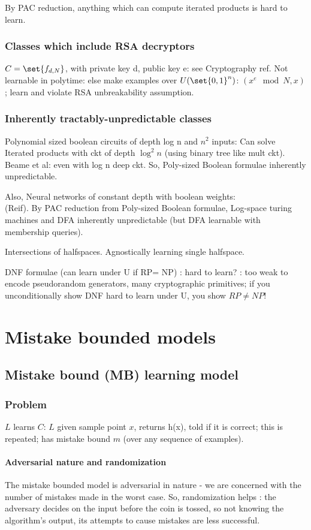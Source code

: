 \documentclass[oneside, article]{memoir}
\begin{document}
By PAC reduction, anything which can compute iterated products is hard to learn.

\subsection{Classes which include RSA decryptors}
$C = \set{f_{d,N}}$, with private key d, public key e: see Cryptography ref. Not learnable in polytime: else make examples over $U(\set{0,1}^{n})$: $(x^{e} \mod N, x)$; learn and violate RSA unbreakability assumption.

\subsection{Inherently tractably-unpredictable classes}
Polynomial sized boolean circuits of depth log n and $n^{2}$ inputs: Can solve Iterated products with ckt of depth $\log^{2} n$ (using binary tree like mult ckt). Beame et al: even with log n deep ckt. So, Poly-sized Boolean formulae inherently unpredictable.

Also, Neural networks of constant depth with boolean weights: \\
(Reif). By PAC reduction from Poly-sized Boolean formulae, Log-space turing machines and DFA inherently unpredictable (but DFA learnable with membership queries).

Intersections of halfspaces. \why Agnostically learning single halfspace. \why

\oprob DNF formulae (can learn under U if RP= NP) : hard to learn? : too weak to encode pseudorandom generators, many cryptographic primitives; if you unconditionally show DNF hard to learn under U, you show $RP \neq NP$!


\chapter{Mistake bounded models}
\section{Mistake bound (MB) learning model}
\subsection{Problem}
$L$ learns $C$: $L$ given sample point $x$, returns h(x), told if it is correct; this is repeated; has mistake bound $m$ (over any sequence of examples).

\subsubsection{Adversarial nature and randomization}
The mistake bounded model is adversarial in nature - we are concerned with the number of mistakes made in the worst case. So, randomization helps : the adversary decides on the input before the coin is tossed, so not knowing the algorithm's output, its attempts to cause mistakes are less successful.
\end{document}
